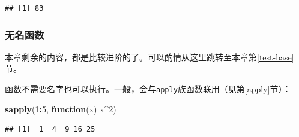 \documentclass[]{book}
\newenvironment{Shaded}{\begin{snugshade}}{\end{snugshade}}
\newcommand{\CommentTok}[1]{\textcolor[rgb]{0.56,0.35,0.01}{\textit{#1}}}
\newcommand{\ControlFlowTok}[1]{\textcolor[rgb]{0.13,0.29,0.53}{\textbf{#1}}}
\newcommand{\DecValTok}[1]{\textcolor[rgb]{0.00,0.00,0.81}{#1}}
\newcommand{\KeywordTok}[1]{\textcolor[rgb]{0.13,0.29,0.53}{\textbf{#1}}}
\newcommand{\NormalTok}[1]{#1}
\newcommand{\OperatorTok}[1]{\textcolor[rgb]{0.81,0.36,0.00}{\textbf{#1}}}
\newcommand{\StringTok}[1]{\textcolor[rgb]{0.31,0.60,0.02}{#1}}
\begin{document}
\begin{Shaded}
\end{Shaded}

\begin{verbatim}
## [1] 83
\end{verbatim}

\hypertarget{anonymous-functions}{%
\subsubsection{无名函数}\label{anonymous-functions}}

本章剩余的内容，都是比较进阶的了。可以酌情从这里跳转至本章第\ref{test-base}节。

函数不需要名字也可以执行。一般，会与\texttt{apply}族函数联用（见第\ref{apply}节）：

\begin{Shaded}
\begin{Highlighting}[]
\KeywordTok{sapply}\NormalTok{(}\DecValTok{1}\OperatorTok{:}\DecValTok{5}\NormalTok{, }\ControlFlowTok{function}\NormalTok{(x) x}\OperatorTok{^}\DecValTok{2}\NormalTok{)}
\end{Highlighting}
\end{Shaded}

\begin{verbatim}
## [1]  1  4  9 16 25
\end{verbatim}
\end{document}
